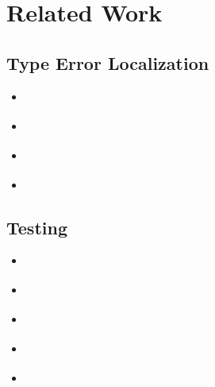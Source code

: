 \section{Related Work}
\label{sec:related-work}


\subsection{Type Error Localization}
\label{sec:type-error-local}
\begin{itemize}
\item \cite{lerner_searching_2007}
\item \cite{zhang_toward_2014}
\item \cite{pavlinovic_finding_2014}
\item \cite{chen_counter-factual_2014}
\end{itemize}

\subsection{Testing}
\label{sec:testing}
\begin{itemize}
\item \cite{claessen_quickcheck:_2000}
\item \cite{runciman_smallcheck_2008}
\item \cite{godefroid_dart:_2005}
\item \cite{cadar_klee:_2008}
\item \cite{tillmann_pexwhite_2008}
\end{itemize}


